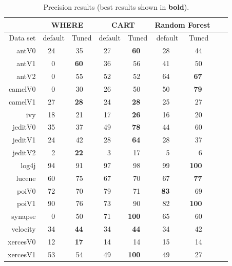 \documentclass{sig-alternative}
\begin{document}
\begin{table}[!t]
\renewcommand{\baselinestretch}{0.8} 

\scriptsize    

\begin{tabular}{r|rl|rl|rl|rl|rl|rlrl}
      &   \multicolumn{4}{c|}{WHERE}         &   \multicolumn{4}{c|}{CART}         &   \multicolumn{4}{c}{Random Forest}         \\\hline
  Data set   &   \multicolumn{2}{c}{default}         &   \multicolumn{2}{c|}{Tuned}         &   \multicolumn{2}{c}{default}         &   \multicolumn{2}{c|}{Tuned}    &   \multicolumn{2}{c}{default}  &   \multicolumn{2}{c}{Tuned}\\\hline
antV0 & 24 &   & 35 &   & 27 &   & {\bf 60} &   & 28 &   & 44 &  \\
antV1 & 0 &   & {\bf 60} &   & 36 &   & 56 &   & 41 &   & 50 &  \\
antV2 & 0 &   & 55 &   & 52 &   & 52 &   & 64 &   & {\bf 67} &  \\
camelV0 & 0 &   & 30 &   & 26 &   & 50 &   & 50 &   & {\bf 79} &  \\
camelV1 & 27 &   & {\bf 28} &   & 24 &   & {\bf 28} &   & 25 &   & 27 &  \\
ivy & 18 &   & 21 &   & 17 &   & {\bf 26} &   & 16 &   & 20 &  \\
jeditV0 & 35 &   & 37 &   & 49 &   & {\bf 78} &   & 44 &   & 60 &  \\
jeditV1 & 24 &   & 42 &   & 28 &   & {\bf 64} &   & 28 &   & 37 &  \\
jeditV2 & 2 &   & {\bf 22} &   & 3 &   & 17 &   & 5 &   & 6 &  \\
log4j & 94 &   & 91 &   & 97 &   & 98 &   & 99 &   & {\bf 100} &  \\
lucene & 60 &   & 75 &   & 67 &   & 70 &   & 67 &   & {\bf 77} &  \\
poiV0 & 72 &   & 70 &   & 79 &   & 71 &   & {\bf 83} &   & 69 &  \\
poiV1 & 90 &   & 76 &   & 73 &   & 90 &   & 82 &   & {\bf 100} &  \\
synapse & 0 &   & 50 &   & 71 &   & {\bf 100} &   & 65 &   & 60 &  \\
velocity & 34 &   & {\bf 44} &   & 34 &   & {\bf 44} &   & 34 &   & 42 &  \\
xercesV0 & 12 &   & {\bf 17} &   & 14 &   & 14 &   & 15 &   & 14 &  \\
xercesV1 & 53 &   & 54 &   & 49 &   & {\bf 100} &   & 49 &   & 27 &  \\
\end{tabular}
\caption{Precision results (best results  shown in {\bf bold}).}
\label{tab:precisionbars}
\end{table}
 
\end{document}

